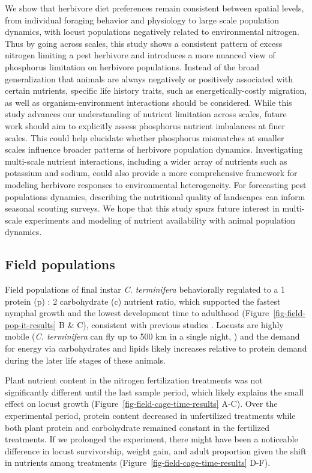\documentclass[
]{article}
\begin{document}
We show that herbivore diet preferences remain consistent between
spatial levels, from individual foraging behavior and physiology to
large scale population dynamics, with locust populations negatively
related to environmental nitrogen. Thus by going across scales, this
study shows a consistent pattern of excess nitrogen limiting a pest
herbivore and introduces a more nuanced view of phosphorus limitation on
herbivore populations. Instead of the broad generalization that animals
are always negatively or positively associated with certain nutrients,
specific life history traits, such as energetically-costly migration, as
well as organism-environment interactions should be considered. While
this study advances our understanding of nutrient limitation across
scales, future work should aim to explicitly assess phosphorus nutrient
imbalances at finer scales. This could help elucidate whether phosphorus
mismatches at smaller scales influence broader patterns of herbivore
population dynamics. Investigating multi-scale nutrient interactions,
including a wider array of nutrients such as potassium and sodium, could
also provide a more comprehensive framework for modeling herbivore
responses to environmental heterogeneity. For forecasting pest
populations dynamics, describing the nutritional quality of landscapes
can inform seasonal scouting surveys. We hope that this study spurs
future interest in multi-scale experiments and modeling of nutrient
availability with animal population dynamics.

\subsection{Field populations}\label{field-populations}

Field populations of final instar \emph{C. terminifera} behaviorally
regulated to a 1 protein (p) : 2 carbohydrate (c) nutrient ratio, which
supported the fastest nymphal growth and the lowest development time to
adulthood (Figure~\ref{fig-field-pop-it-results} B \& C), consistent
with previous studies
\citep{clissold_regulation_2014, lawton_mismatched_2021}. Locusts are
highly mobile (\emph{C. terminifera} can fly up to 500 km in a single
night, \citep{deveson_not_2005}) and the demand for energy via
carbohydrates and lipids likely increases relative to protein demand
during the later life stages of these animals.

Plant nutrient content in the nitrogen fertilization treatments was not
significantly different until the last sample period, which likely
explains the small effect on locust growth
(Figure~\ref{fig-field-cage-time-results} A-C). Over the experimental
period, protein content decreased in unfertilized treatments while both
plant protein and carbohydrate remained constant in the fertilized
treatments. If we prolonged the experiment, there might have been a
noticeable difference in locust survivorship, weight gain, and adult
proportion given the shift in nutrients among treatments
(Figure~\ref{fig-field-cage-time-results} D-F).
\end{document}
